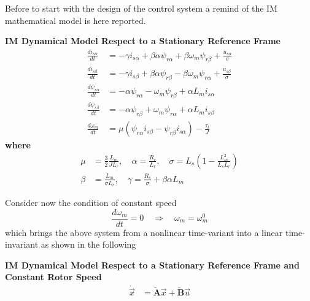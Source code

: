 \documentclass[12pt,a4paper,oneside]{book}
\begin{document}
\begin{onehalfspace}
Before to start with the design of the control system a remind of the IM 
mathematical model is here reported. 
\begin{mybox}
	\textbf{IM Dynamical Model Respect to a Stationary Reference Frame}
	\begin{equation}\label{im_control_problem_eq_1}
		\begin{aligned}
			\frac{di_{s\alpha}}{dt} &= -\gamma i_{s\alpha}  + 
			\beta\alpha\psi_{r\alpha}+\beta\omega_m\psi_{r\beta} + 
			\frac{u_{s\alpha}}{\sigma}\\[6pt]
			\frac{di_{s\beta}}{dt} &= -\gamma i_{s\beta}  + 
			\beta\alpha\psi_{r\beta}-\beta\omega_m\psi_{r\alpha} + 
			\frac{u_{s\beta}}{\sigma} \\[6pt]
			\frac{d\psi_{r\alpha}}{dt} &= -\alpha \psi_{r\alpha} 
			-\omega_m\psi_{r\beta}+\alpha L_m i_{s\alpha} \\[6pt]
			\frac{d\psi_{r\beta}}{dt} &= -\alpha \psi_{r\beta} 
			+\omega_m\psi_{r\alpha}+\alpha L_m i_{s\beta} \\[6pt]
			\frac{d\omega_m}{dt} &= \mu \left(\psi_{r\alpha}i_{s\beta} - 
			\psi_{r\beta}i_{s\alpha}\right)-\frac{\tau_l}{J}
		\end{aligned}
	\end{equation}
	\textbf{where}
	\begin{equation}\label{im_control_problem_eq_2}
		\begin{aligned}
			\mu & = \frac{3}{2}\frac{L_m}{JL_r}, \quad
			\alpha = \frac{R_r}{L_r},  \quad
			\sigma = L_s \left(1-\frac{L_m^2}{L_sL_r}\right) \\[6pt]
			\beta & = \frac{L_m}{\sigma L_r},  \quad
			\gamma = \frac{R_s}{\sigma} + \beta \alpha L_m
		\end{aligned}
	\end{equation}
\end{mybox}
Consider now the condition of constant speed
\begin{equation}\label{im_control_problem_eq_3}
	\frac{d\omega_m}{dt}=0 \quad\Rightarrow\quad\omega_m=\omega_m^0
\end{equation}
which brings the above system from a nonlinear time-variant into a linear 
time-invariant as shown in the following
\begin{mybox}
	\textbf{IM Dynamical Model Respect to a Stationary Reference Frame and 
		Constant Rotor Speed}
	\begin{equation}\label{im_control_problem_eq_4}
		\begin{aligned}
			\dot{\vec{x}} &=\tilde{\mathbf{A}}\vec{x}+\tilde{\mathbf{B}}\vec{u} 

\end{aligned}
\end{equation}
\end{mybox}
\end{onehalfspace}
\end{document}
